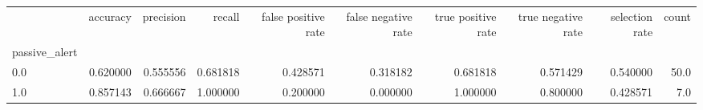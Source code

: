 \begin{tabular}{lrrrrrrrrr}
\toprule
{} &  accuracy &  precision &    recall &  false positive rate &  false negative rate &  true positive rate &  true negative rate &  selection rate &  count \\
passive\_alert &           &            &           &                      &                      &                     &                     &                 &        \\
\midrule
0.0           &  0.620000 &   0.555556 &  0.681818 &             0.428571 &             0.318182 &            0.681818 &            0.571429 &        0.540000 &   50.0 \\
1.0           &  0.857143 &   0.666667 &  1.000000 &             0.200000 &             0.000000 &            1.000000 &            0.800000 &        0.428571 &    7.0 \\
\bottomrule
\end{tabular}
